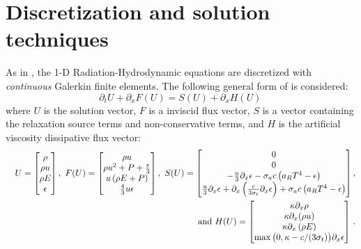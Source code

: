 \documentclass[times,doublespace]{fldauth}%
\begin{document}
\section{Discretization and solution techniques}
\label{sec:discr}
%
As in \cite{our_jcp_radhy_paper}, the 1-D Radiation-Hydrodynamic equations  are discretized with \emph{continuous} Galerkin finite elements. 
The following general form of  is considered:
\begin{equation}
\label{eq:form}
\partial_t U + \partial_x F \left( U \right) = S(U) + \partial_x H \left(U\right) \,
\end{equation}
where $U$ is the solution vector, $F$ is a inviscid flux vector, $S$ is a vector containing the relaxation source terms and non-conservative terms, and $H$ is the artificial viscosity dissipative flux vector:
\begin{eqnarray*}
&&U = 
\begin{bmatrix}
\rho \\
\rho u \\
\rho E \\
\epsilon
\end{bmatrix}
,\
F(U) = 
\begin{bmatrix}
\rho u \\
\rho u^2 + P + \frac{\epsilon}{3} \\
u \left( \rho E + P \right) \\
\frac{4}{3} u \epsilon
\end{bmatrix}
,\ 
S(U) = 
\begin{bmatrix}
0 \\
0 \\
-\frac{u}{3} \partial_x \epsilon - \sigma_a c \left( \ar T^4 - \epsilon \right) \\
\frac{u}{3} \partial_x \epsilon + \partial_x \left( \frac{c}{3 \sigma_t} \partial_x \epsilon \right) + \sigma_a c \left( \ar T^4 - \epsilon \right)
\end{bmatrix}
,
\\
&&\text{ and } 
H(U) = 
\begin{bmatrix}
\kappa \partial_x \rho \\
\kappa \partial_x (\rho u) \\
\kappa \partial_x \left( \rho E \right)\\
\max \big( 0, \kappa- c/(3 \sigma_t) \big) \partial_x \epsilon 
\end{bmatrix} \,.
\end{eqnarray*}
\end{document}
